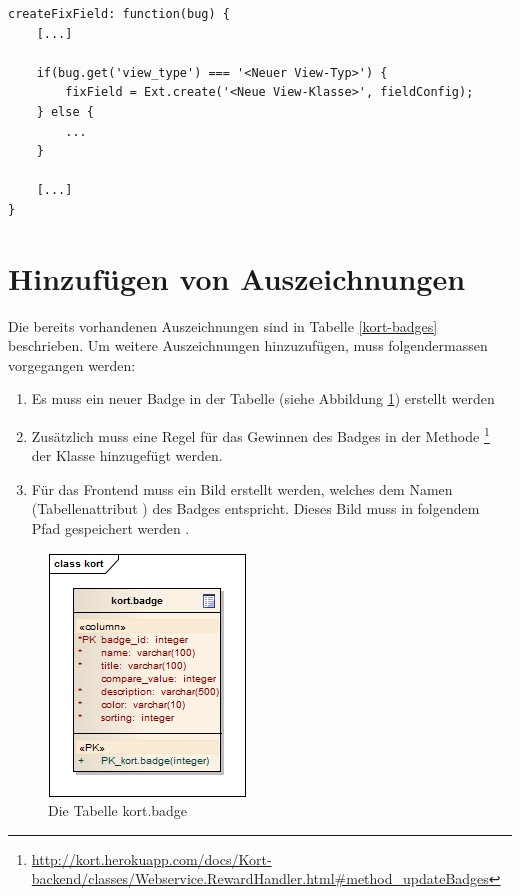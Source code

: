 \lstset{language=JavaScript}
\begin{lstlisting}[caption=Unterscheidung der View-Typen in Kort.view.bugmap.fix.Form, label=code-kort-add_view_type]
createFixField: function(bug) {
	[...]
	
	if(bug.get('view_type') === '<Neuer View-Typ>') {
		fixField = Ext.create('<Neue View-Klasse>', fieldConfig);
	} else {
		...
	}
	
	[...]
}
\end{lstlisting}

\section{Hinzufügen von Auszeichnungen}
\label{kort-additional-badges}
Die bereits vorhandenen Auszeichnungen sind in Tabelle \ref{kort-badges} beschrieben. Um weitere Auszeichnungen hinzuzufügen, muss folgendermassen vorgegangen werden:

\begin{enumerate}
\item Es muss ein neuer Badge in der Tabelle  (siehe Abbildung \ref{image-kort-database-table-badge}) erstellt werden
\item Zusätzlich muss eine Regel für das Gewinnen des Badges in der Methode \footnote{\url{http://kort.herokuapp.com/docs/Kort-backend/classes/Webservice.RewardHandler.html\#method_updateBadges}} der Klasse  hinzugefügt werden.
\item Für das Frontend muss ein Bild erstellt werden, welches dem Namen (Tabellenattribut ) des Badges entspricht. Dieses Bild muss in folgendem Pfad gespeichert werden .
\end{enumerate}

\begin{figure}[H]
	\centering
	\includegraphics[scale=0.7]{images/uml/kort-database-table-badge}
	\caption{Die Tabelle kort.badge}
	\label{image-kort-database-table-badge}
\end{figure}

